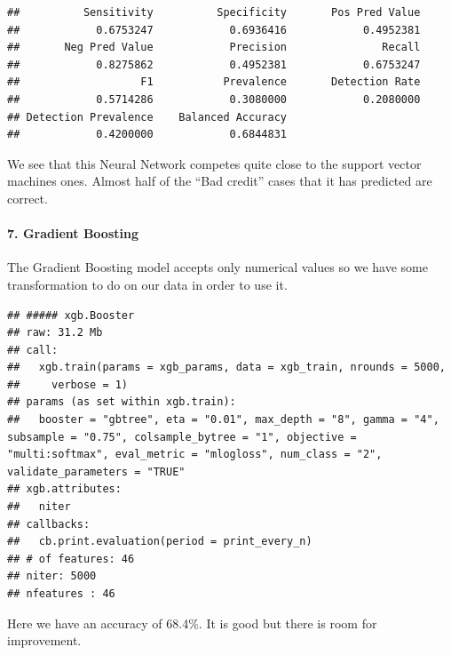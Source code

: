 \documentclass[
]{article}
\begin{document}
\begin{verbatim}
##          Sensitivity          Specificity       Pos Pred Value 
##            0.6753247            0.6936416            0.4952381 
##       Neg Pred Value            Precision               Recall 
##            0.8275862            0.4952381            0.6753247 
##                   F1           Prevalence       Detection Rate 
##            0.5714286            0.3080000            0.2080000 
## Detection Prevalence    Balanced Accuracy 
##            0.4200000            0.6844831
\end{verbatim}

We see that this Neural Network competes quite close to the support
vector machines ones. Almost half of the ``Bad credit'' cases that it
has predicted are correct.

\hypertarget{gradient-boosting}{%
\paragraph{7. Gradient Boosting}\label{gradient-boosting}}

The Gradient Boosting model accepts only numerical values so we have
some transformation to do on our data in order to use it.

\begin{verbatim}
## ##### xgb.Booster
## raw: 31.2 Mb 
## call:
##   xgb.train(params = xgb_params, data = xgb_train, nrounds = 5000, 
##     verbose = 1)
## params (as set within xgb.train):
##   booster = "gbtree", eta = "0.01", max_depth = "8", gamma = "4", subsample = "0.75", colsample_bytree = "1", objective = "multi:softmax", eval_metric = "mlogloss", num_class = "2", validate_parameters = "TRUE"
## xgb.attributes:
##   niter
## callbacks:
##   cb.print.evaluation(period = print_every_n)
## # of features: 46 
## niter: 5000
## nfeatures : 46
\end{verbatim}

Here we have an accuracy of 68.4\%. It is good but there is room for
improvement.
\end{document}
